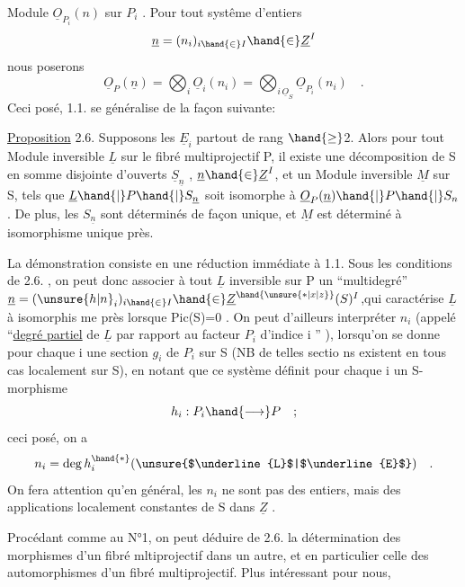
Module  $\underline{O}_{P_i}(n)$ sur $P_i$ . Pour tout systême d'entiers
\[ \underline{n} = (n_i)_{i \hand{\in} I} \hand{\in} \underline{Z}^I \]
nous  poserons
\[ \underline{O}_P(\underline{n}) = \bigotimes_i \underline{O}_i(n_i) = \bigotimes_{i\,\underline{O}_S} \underline{O}_{P_i}(n_i) \quad . \]
Ceci posé, 1.1. se généralise de la façon suivante:

\uline{Proposition} 2.6. Supposons les $\underline{E}_i$ partout de rang $\hand{\geq}$2. Alors pour tout
Module inversible $\underline{L}$ sur le fibré multiprojectif P, il existe une
 décomposition de S en somme disjointe d'ouverts $\underline{S}_{\underline{n}}$ , $\underline{n} \hand{\in} \underline{Z}^I$,
et  un Module inversible $\underline{M}$ sur S, tels que $\underline{L}\hand{|}P\hand{|}S_{\underline{n}}$
soit isomorphe à $\underline{O}_P(\underline{n})\hand{|}P\hand{|}S_n$ . De plus, les $S_{\underline{n}}$ sont déterminés de façon
unique, et  $\underline{M}$ est déterminé à isomorphisme unique près.

 La démonstration  consiste en une réduction immédiate à 1.1.
Sous les conditions de 2.6. , on peut donc associer à tout $\underline{L}$ inversible
sur P un ``multidegré'' $\underline{n} = (\unsure{h|n}_i)_{i \hand{\in} I} \hand{\in} \underline{Z}^{\hand{\unsure{*|x|z}}}(S)^I$,qui caractérise $\underline{L}$ à isomorphis
me près lorsque Pic(S)=0 . On peut d'ailleurs interpréter $n_i$ (appelé
``\uline{degré partiel} de $\underline{L}$ par rapport au facteur $P_i$ d'indice i '' ), lorsqu'on
se donne pour chaque i une section $g_i$ de $P_i$ sur S (NB de telles sectio
ns existent en tous cas localement sur S), en notant que ce système définit
pour chaque i un S-morphisme 
\[ h_i : P_i \hand{\longrightarrow} P \quad ; \]
ceci posé, on a
\[ n_i = \deg h_i^{\hand{*}}(\unsure{$\underline{L}$|$\underline{E}$}) \quad . \]
On fera attention qu'en général, les $n_i$ ne sont pas des entiers, mais des
applications localement constantes de S dans $\underline{Z}$ .

Procédant comme au N°1, on peut déduire de 2.6. la détermination des
morphismes d'un fibré mltiprojectif dans un autre, et en particulier celle
des automorphismes d'un fibré multiprojectif. Plus intéressant pour nous,

